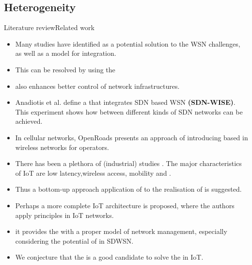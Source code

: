 \subsection{Heterogeneity}

\begin{frame}{Literature review}{Related work}
\begin{itemize}
	\item[\cite{qin_software_2014}] Many studies have identified  as a potential solution to the WSN challenges,
	as well as a model for  integration.
	
	\item[\cite{qin_software_2014}] This  can be resolved by using the 
	
	\item[\cite{kobo_survey_2017}]  also enhances better control of  network infrastructures.
	
	\item[\cite{kobo_survey_2017}] Anadiotis et al. define a  that integrates SDN based WSN \textbf{(SDN-WISE)}.
		This experiment shows how  between different kinds of SDN networks can be achieved.
		
	\item[\cite{kobo_survey_2017}] In cellular networks,
		OpenRoads presents an approach of introducing  based  in wireless networks for operators.

	\item[\cite{ndiaye_software_2017}] There has been a plethora of (industrial) studies .
		The major characteristics of IoT are low latency,wireless access, mobility and .
	
	\item[\cite{ndiaye_software_2017}] Thus a bottom-up approach application of  to the realisation of  is suggested.

	\item[\cite{ndiaye_software_2017}] Perhaps a more complete IoT architecture is proposed,
		where the authors apply  principles in IoT  networks.
		
	\item[\cite{bera_softwaredefined_2017}] it provides the  with a proper model of network management,
		especially considering the potential of  in SDWSN.
		
	\item[\cite{bera_softwaredefined_2017}] We conjecture that the  is a good candidate to solve the  in IoT.
	
\end{itemize}

\end{frame}

